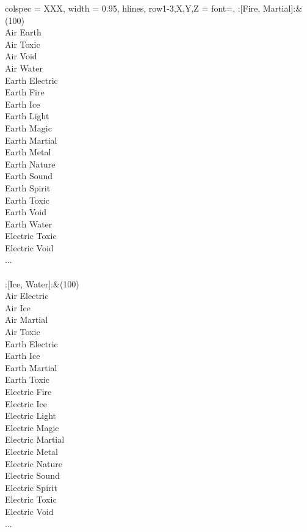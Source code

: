 \begin{longtblr}[
	caption = {2v2 Defending Weak},
	label = {2v2-Defending-Weak},
]{
	colspec = {XXX}, width = 0.95\linewidth,
	hlines,
	row{1-3,X,Y,Z} = {font=\bfseries},
}
	:[Fire, Martial]:&{(100)\\
	Air Earth \\
	Air Toxic \\
	Air Void \\
	Air Water \\
	Earth Electric \\
	Earth Fire \\
	Earth Ice \\
	Earth Light \\
	Earth Magic \\
	Earth Martial \\
	Earth Metal \\
	Earth Nature \\
	Earth Sound \\
	Earth Spirit \\
	Earth Toxic \\
	Earth Void \\
	Earth Water \\
	Electric Toxic \\
	Electric Void \\
	...\\
	}\\

	:[Ice, Water]:&{(100)\\
	Air Electric \\
	Air Ice \\
	Air Martial \\
	Air Toxic \\
	Earth Electric \\
	Earth Ice \\
	Earth Martial \\
	Earth Toxic \\
	Electric Fire \\
	Electric Ice \\
	Electric Light \\
	Electric Magic \\
	Electric Martial \\
	Electric Metal \\
	Electric Nature \\
	Electric Sound \\
	Electric Spirit \\
	Electric Toxic \\
	Electric Void \\
	...\\
	}\\


\end{longtblr}
